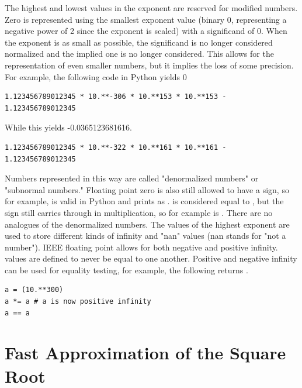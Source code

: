 The highest and lowest values in the exponent are reserved for modified numbers.
Zero is represented using the smallest exponent value (binary 0, representing a negative power of 2 since the exponent is scaled) with a significand of 0.
When the exponent is as small as possible, the significand is no longer considered normalized and the implied one is no longer considered.
This allows for the representation of even smaller numbers, but it implies the loss of some precision.
For example, the following code in Python yields 0
\begin{lstlisting}
1.123456789012345 * 10.**-306 * 10.**153 * 10.**153 - 1.123456789012345
\end{lstlisting}
While this yields -0.0365123681616.
\begin{lstlisting}
1.123456789012345 * 10.**-322 * 10.**161 * 10.**161 - 1.123456789012345
\end{lstlisting}
Numbers represented in this way are called "denormalized numbers" or "subnormal numbers."
Floating point zero is also still allowed to have a sign, so for example,  is valid in Python and prints as .
 is considered equal to , but the sign still carries through in multiplication, so for example  is .
There are no analogues of the denormalized numbers.
The values of the highest exponent are used to store different kinds of infinity and "nan" values (nan stands for "not a number").
IEEE floating point allows for both negative and positive infinity.
 values are defined to never be equal to one another.
Positive and negative infinity can be used for equality testing, for example, the following returns .
\begin{lstlisting}
a = (10.**300)
a *= a # a is now positive infinity
a == a
\end{lstlisting}


\section*{Fast Approximation of the Square Root}


